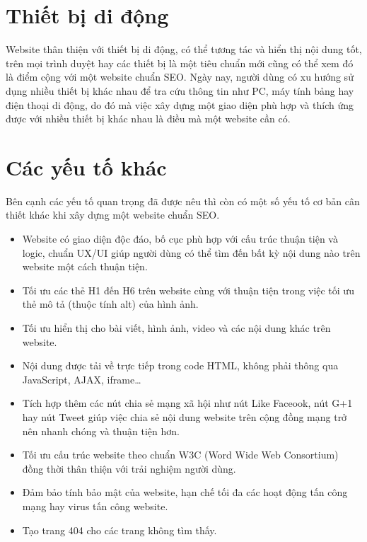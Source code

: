 \section{Thiết bị di động}
Website thân thiện với thiết bị di động, có thể tương tác và hiển thị nội dung tốt, trên mọi trình duyệt hay các thiết bị là một tiêu chuẩn mới cũng có thể xem đó là điểm cộng với một website chuẩn SEO. Ngày nay, người dùng có xu hướng sử dụng nhiều thiết bị khác nhau để tra cứu thông tin như PC, máy tính bảng hay điện thoại di động, do đó mà việc xây dựng một giao diện phù hợp và thích ứng được với nhiều thiết bị khác nhau là điều mà một website cần có.
\section{Các yếu tố khác}
Bên cạnh các yếu tố quan trọng đã được nêu thì còn có một số yếu tố cơ bản cân thiết khác khi xây dựng một website chuẩn SEO.
\begin{itemize}
	\item Website có giao diện độc đáo, bố cục phù hợp với cấu trúc thuận tiện và logic, chuẩn UX/UI giúp người dùng có thể tìm đến bất kỳ nội dung nào trên website một cách thuận tiện.
	\item Tối ưu các thẻ H1 đến H6 trên website cùng với thuận tiện trong việc tối ưu thẻ mô tả (thuộc tính alt) của hình ảnh.
	\item Tối ưu hiển thị cho bài viết, hình ảnh, video và các nội dung khác trên website.
	\item Nội dung được tải về trực tiếp trong code HTML, không phải thông qua JavaScript, AJAX, iframe\ldots
	\item Tích hợp thêm các nút chia sẻ mạng xã hội như nút Like Faceook, nút G+1 hay nút Tweet giúp việc chia sẻ nội dung website trên cộng đồng mạng trở nên nhanh chóng và thuận tiện hơn.
	\item Tối ưu cấu trúc website theo chuẩn W3C (Word Wide Web Consortium) đồng thời thân thiện với trải nghiệm người dùng.
	\item Đảm bảo tính bảo mật của website, hạn chế tối đa các hoạt động tấn công mạng hay virus tấn công website.
	\item Tạo trang 404 cho các trang không tìm thấy.
\end{itemize}